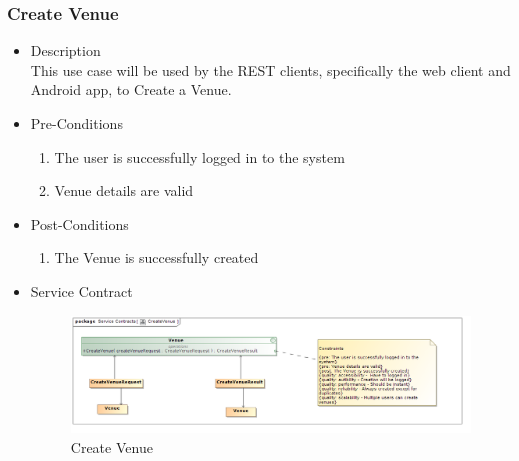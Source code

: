 \documentclass[a4paper,10pt]{article}
\begin{document}
\subsubsection{Create Venue}
	\begin{itemize}
		\item Description\\
			This use case will be used by the REST clients, specifically the web client and Android app, to Create a Venue.
		\item Pre-Conditions
			\begin{enumerate}
				\item The user is successfully logged in to the system
				\item Venue details are valid
			\end{enumerate}
		\item Post-Conditions
			\begin{enumerate}
				\item The Venue is successfully created
						
			\end{enumerate}
		\item Service Contract
			\begin{figure}[H]
				\includegraphics[scale=0.5]{CreateVenue}
				\caption{Create Venue}
			\end{figure}
	\end{itemize}
\end{document}

